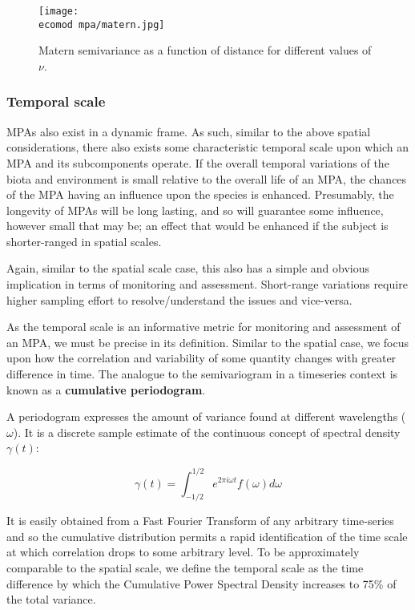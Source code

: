 \documentclass[letterpaper,portrait,11pt]{scrartcl}
\numberwithin{equation}{section}		%
\numberwithin{figure}{section}		%
\numberwithin{table}{section}				%
\newcommand{\ecomod}{\string~/ecomod_data/}   %
\begin{document}
\begin{figure}
  \centering
  \texttt{[image: \\ecomod mpa/matern.jpg]}
  \caption{Matern semivariance as a function of distance for different values of $\nu$.}
    \label{fig:matern}
\end{figure}


\subsubsection{Temporal scale}
\label{sec:interpolationTS}

MPAs also exist in a dynamic frame. As such, similar to the above spatial considerations, there also exists some characteristic temporal scale upon which an MPA and its subcomponents operate. If the overall temporal variations of the biota and environment is small relative to the overall life of an MPA, the chances of the MPA having an influence upon the species is enhanced. Presumably, the longevity of MPAs will be long lasting, and so will guarantee some influence, however small that may be; an effect that would be enhanced if the subject is shorter-ranged in spatial scales.

Again, similar to the spatial scale case, this also has a simple and obvious implication in terms of monitoring and assessment. Short-range variations require higher sampling effort to resolve/understand the issues and vice-versa.

As the temporal scale is an informative metric for monitoring and assessment of an MPA, we must be precise in its definition. Similar to the spatial case, we focus upon how the correlation and variability of some quantity changes with greater difference in time. The analogue to the semivariogram in a timeseries context is known as a \textbf{cumulative periodogram}. 

A periodogram expresses the amount of variance found at different wavelengths ($\omega$). It is a discrete sample estimate of the continuous concept of spectral density $\gamma(t)$: 

\begin{equation}
  \label{eq:spectraldDensity}
  \gamma(t) = \int_{-1/2}^{1/2} e^{2\pi i \omega t} f(\omega) d \omega
\end{equation}

It is easily obtained from a Fast Fourier Transform of any arbitrary time-series and so the cumulative distribution permits a rapid identification of the time scale at which correlation drops to some arbitrary level. To be approximately comparable to the spatial scale, we define the temporal scale as the time difference by which the Cumulative Power Spectral Density increases to 75\% of the total variance.
\end{document}
